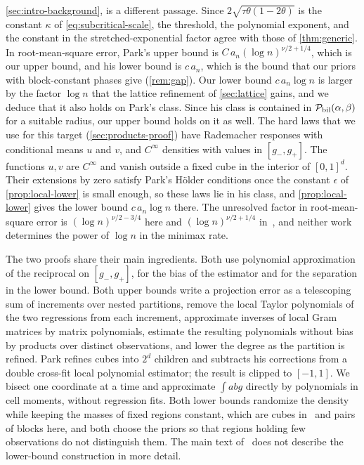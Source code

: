 \cref{sec:intro-background}, is a different passage. Since
$2\sqrt{\tau\theta(1-2\theta)}$ is the
constant $\kappa$ of \eqref{eq:subcritical-scale}, the threshold, the
polynomial exponent, and the constant in the stretched-exponential
factor agree with those of \cref{thm:generic}. In root-mean-square
error, Park's upper bound is $C\,a_n(\log n)^{\nu/2+1/4}$, which is our
upper bound, and his lower bound is $c\,a_n$, which is the bound that
our priors with block-constant phases give (\cref{rem:gap}). Our lower
bound $c\,a_n\log n$ is larger by the factor $\log n$ that the lattice
refinement of \cref{sec:lattice} gains, and we deduce that it also
holds on Park's class. Since his class is contained in
$\mathcal P_{\rm bil}(\alpha,\beta)$ for a suitable radius, our upper bound
holds on it as well. The hard laws that we use for this target
(\cref{sec:products-proof}) have Rademacher responses with conditional
means $u$ and $v$, and $C^\infty$ densities with values in
$[g_-,g_+]$. The functions $u,v$ are $C^\infty$ and vanish outside a
fixed cube in the interior of $[0,1]^d$. Their extensions by zero
satisfy Park's H\"older conditions once the constant $\epsilon$ of
\cref{prop:local-lower} is small enough, so these laws lie in his
class, and \cref{prop:local-lower} gives the lower bound
$c\,a_n\log n$ there. The unresolved factor in root-mean-square error
is $(\log n)^{\nu/2-3/4}$ here and $(\log n)^{\nu/2+1/4}$
in~\cite{park}, and neither work determines the power of $\log n$ in
the minimax rate.

The two proofs share their main ingredients. Both use polynomial
approximation of the reciprocal on $[g_-,g_+]$, for the bias of the
estimator and for the separation in the lower bound. Both upper bounds
write a projection error as a telescoping sum of increments over
nested partitions, remove the local Taylor polynomials of the two
regressions from each increment, approximate inverses of local Gram
matrices by matrix polynomials, estimate the resulting polynomials
without bias by products over distinct observations, and lower the
degree as the partition is refined. Park refines cubes into $2^d$
children and subtracts his corrections from a double cross-fit local
polynomial estimator; the result is clipped to $[-1,1]$. We bisect one
coordinate at a time and approximate $\int abg$ directly by
polynomials in cell moments, without regression fits. Both lower
bounds randomize the density while keeping the masses of fixed regions
constant, which are cubes in~\cite{park} and pairs of blocks here, and
both choose the priors so that regions holding few observations do not
distinguish them. The main text of~\cite{park} does not describe the
lower-bound construction in more detail.

